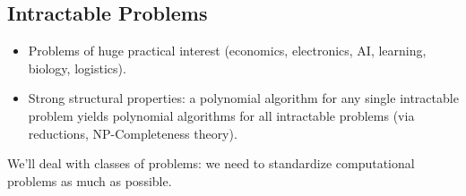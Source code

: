 
\subsection{Intractable Problems}
\begin{itemize}
\item Problems of huge practical interest (economics, electronics, AI, learning, biology, logistics).
\item Strong structural properties: a polynomial algorithm for any single intractable problem yields polynomial algorithms for all intractable problems (via reductions, NP-Completeness theory).
\end{itemize}


We'll deal with classes of problems: we need to standardize computational problems as much as possible.
